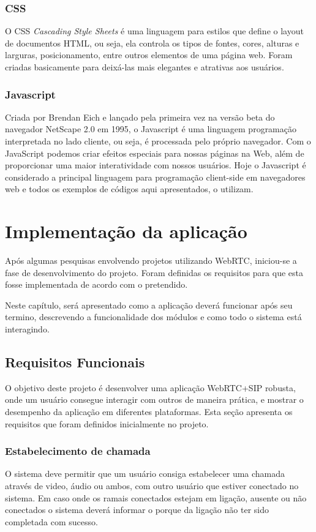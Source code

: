 \documentclass[12pt,a4paper,oneside]{report}
\begin{document}
\subsection{CSS}
\label{ss_css}
O CSS \textit{Cascading Style Sheets} é uma linguagem para estilos que define o layout de documentos HTML, ou seja, ela controla os tipos de  fontes, cores, alturas e larguras, posicionamento, entre outros elementos de uma página web. Foram criadas basicamente para deixá-las mais elegantes e atrativas aos usuários.

\subsection{Javascript}
\label{ss_javascript}
Criada por Brendan Eich e lançado pela primeira vez na versão beta do navegador NetScape 2.0 em 1995, o Javascript é uma linguagem programação interpretada no lado cliente, ou seja, é processada pelo próprio navegador. Com o JavaScript podemos criar efeitos especiais para nossas páginas na Web, além de proporcionar uma maior interatividade com nossos usuários. \cite{JAVASCRIPT}
Hoje o Javascript é considerado a principal linguagem para programação client-side em navegadores web e todos os exemplos de códigos aqui apresentados, o utilizam. 

\chapter{Implementação da aplicação} %
\label{c_bibliografia} %
Após algumas pesquisas envolvendo projetos utilizando WebRTC, iniciou-se a fase de desenvolvimento do projeto. Foram definidas os requisitos para que esta fosse implementada de acordo com o pretendido.

Neste capítulo, será apresentado como a aplicação deverá funcionar após seu termino, descrevendo a funcionalidade dos módulos e como todo o sistema está interagindo. 

\section{Requisitos Funcionais}
O objetivo deste projeto é desenvolver uma aplicação WebRTC+SIP robusta, onde um usuário consegue interagir com outros de maneira prática, e mostrar o desempenho da aplicação em diferentes plataformas. Esta seção apresenta os requisitos que foram definidos inicialmente no projeto. 

\subsection{Estabelecimento de chamada}
O sistema deve permitir que um usuário consiga estabelecer uma chamada através de video, áudio ou ambos, com outro usuário que estiver conectado no sistema. Em caso onde os ramais conectados estejam em ligação, ausente ou não conectados o sistema deverá informar o porque da ligação não ter sido completada com sucesso.
\end{document}
